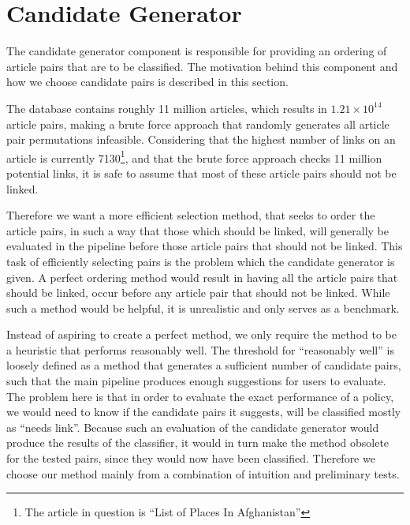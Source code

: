 \section{Candidate Generator}
The candidate generator component is responsible for providing an ordering of article pairs that are to be classified. The motivation behind this component and how we choose candidate pairs is described in this section.

The database contains roughly 11 million articles, which results in $1.21 \times 10^{14}$ article pairs, making a brute force approach that randomly generates all article pair permutations infeasible. Considering that the highest number of links on an article is currently 7130\footnote{The article in question is \enquote{List of Places In Afghanistan}}, and that the brute force approach checks 11 million potential links, it is safe to assume that most of these article pairs should not be linked.

Therefore we want a more efficient selection method, that seeks to order the article pairs, in such a way that those which should be linked, will generally be evaluated in the pipeline before those article pairs that should not be linked. This task of efficiently selecting pairs is the problem which the candidate generator is given. A perfect ordering method would result in having all the article pairs that should be linked, occur before any article pair that should not be linked. While such a method would be helpful, it is unrealistic and only serves as a benchmark.

Instead of aspiring to create a perfect method, we only require the method to be a heuristic that performs reasonably well. The threshold for \enquote{reasonably well} is loosely defined as a method that generates a sufficient number of candidate pairs, such that the main pipeline produces enough suggestions for users to evaluate. The problem here is that in order to evaluate the exact performance of a policy, we would need to know if the candidate pairs it suggests, will be classified mostly as \enquote{needs link}. Because such an evaluation of the candidate generator would produce the results of the classifier, it would in turn make the method obsolete for the tested pairs, since they would now have been classified.  Therefore we choose our method mainly from a combination of intuition and preliminary tests.

